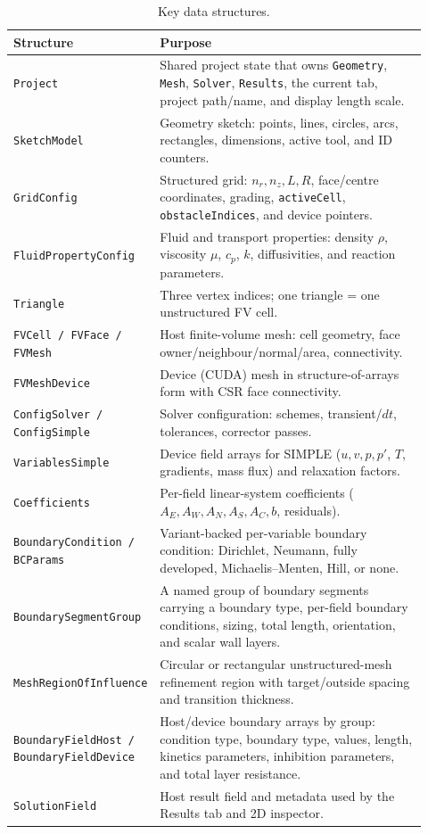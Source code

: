 \documentclass[11pt]{article}
\begin{document}
\begin{table}[h]
\centering
\caption{Key data structures.}
\label{tab:structs}
\begin{tabular}{@{}>{\raggedright\arraybackslash}p{0.26\linewidth}
                   >{\raggedright\arraybackslash}p{0.66\linewidth}@{}}
\toprule
\textbf{Structure} & \textbf{Purpose} \\
\midrule
\texttt{Project} & Shared project state that owns \texttt{Geometry}, \texttt{Mesh}, \texttt{Solver}, \texttt{Results}, the current tab, project path/name, and display length scale. \\
\texttt{SketchModel} & Geometry sketch: points, lines, circles, arcs, rectangles, dimensions, active tool, and ID counters. \\
\texttt{GridConfig} & Structured grid: $n_r, n_z, L, R$, face/centre coordinates, grading, \texttt{activeCell}, \texttt{obstacleIndices}, and device pointers. \\
\texttt{FluidPropertyConfig} & Fluid and transport properties: density $\rho$, viscosity $\mu$, $c_p$, $k$, diffusivities, and reaction parameters. \\
\texttt{Triangle} & Three vertex indices; one triangle = one unstructured FV cell. \\
\texttt{FVCell / FVFace / FVMesh} & Host finite-volume mesh: cell geometry, face owner/neighbour/normal/area, connectivity. \\
\texttt{FVMeshDevice} & Device (CUDA) mesh in structure-of-arrays form with CSR face connectivity. \\
\texttt{ConfigSolver / ConfigSimple} & Solver configuration: schemes, transient/$dt$, tolerances, corrector passes. \\
\texttt{VariablesSimple} & Device field arrays for SIMPLE ($u, v, p, p'$, $T$, gradients, mass flux) and relaxation factors. \\
\texttt{Coefficients} & Per-field linear-system coefficients ($A_E, A_W, A_N, A_S, A_C, b$, residuals). \\
\texttt{BoundaryCondition / BCParams} & Variant-backed per-variable boundary condition: Dirichlet, Neumann, fully developed, Michaelis--Menten, Hill, or none. \\
\texttt{BoundarySegmentGroup} & A named group of boundary segments carrying a boundary type, per-field boundary conditions, sizing, total length, orientation, and scalar wall layers. \\
\texttt{MeshRegionOfInfluence} & Circular or rectangular unstructured-mesh refinement region with target/outside spacing and transition thickness. \\
\texttt{BoundaryFieldHost / BoundaryFieldDevice} & Host/device boundary arrays by group: condition type, boundary type, values, length, kinetics parameters, inhibition parameters, and total layer resistance. \\
\texttt{SolutionField} & Host result field and metadata used by the Results tab and 2D inspector. \\
\bottomrule
\end{tabular}
\end{table}
\end{document}
